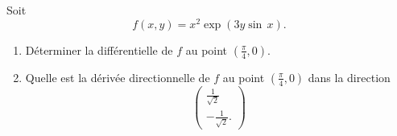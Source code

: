 
\begin{exercice}\label{exoDerive-0009}

    Soit
    \begin{equation}
        f(x,y)=x^2\exp(3y\sin\, x).
    \end{equation}
    \begin{enumerate}
        \item
            Déterminer la différentielle de \( f\) au point \( (\frac{ \pi }{ 4 },0)\).
        \item
            Quelle est la dérivée directionnelle de \( f\) au point \( (\frac{ \pi }{ 4 },0)\) dans la direction
            \begin{equation}
                \begin{pmatrix}
                    \frac{1}{ \sqrt{2} }    \\ 
                    -\frac{ 1 }{ \sqrt{2} }.    
                \end{pmatrix}
            \end{equation}
    \end{enumerate}

\end{exercice}

